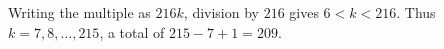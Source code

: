 Writing the multiple as $216k$, division by $216$ gives $6<k<216$. Thus $k=7,8,\ldots,215$, a total of $215-7+1=\boxed{209}$.
